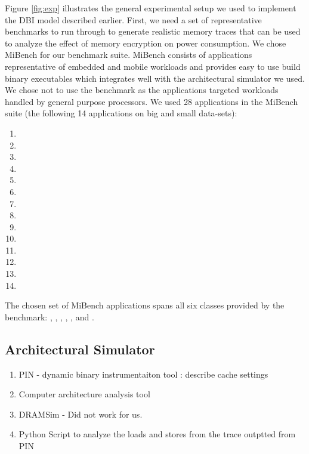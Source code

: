 Figure \ref{fig:exp} illustrates the general experimental setup we used to
implement the DBI model described earlier. First, we need a set of
representative benchmarks to run through to generate realistic memory traces
that can be used to analyze the effect of memory encryption on power
consumption. We chose MiBench \cite{mibench} for our benchmark suite. MiBench
consists of applications representative of embedded and mobile workloads and
provides easy to use build binary executables which integrates well with the
 architectural simulator we used. We chose not to use the 
benchmark as the applications targeted workloads handled by general purpose
processors. We used 28 applications in the MiBench suite (the following 14
applications on big and small data-sets):

\begin{multicols}{2}
  \centering
  \begin{enumerate}
    \item {}
    \item {}
    \item {}
    \item {}
    \item {}
    \item {}
    \item {}
    \item {}
    \item {}
    \item {}
    \item {}
    \item {}
    \item {}
    \item {}
  \end{enumerate}
\end{multicols}

The chosen set of MiBench applications spans all six classes provided by the
benchmark: , , , ,
, and .

\subsection{Architectural Simulator}

\begin{enumerate}
  \item PIN - dynamic binary instrumentaiton tool : describe cache settings
  \item Computer architecture analysis tool
  \item DRAMSim - Did not work for us.
  \item Python Script to analyze the loads and stores from the trace outptted
    from PIN
\end{enumerate}
